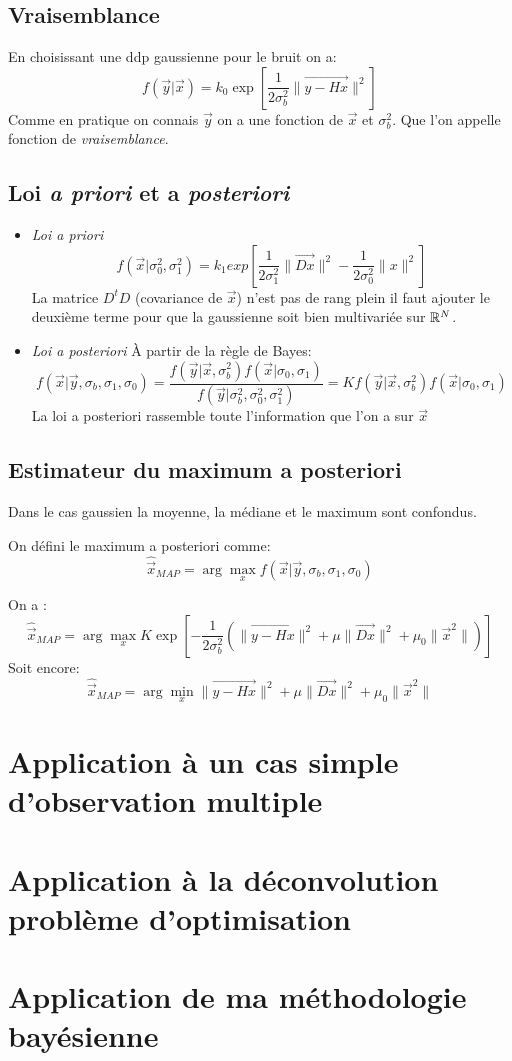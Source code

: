 \documentclass[main.tex]{subfiles}
\begin{document}
\subsection{Vraisemblance}
\begin{defin}
  En choisissant une ddp gaussienne pour le bruit on a:
  \[
    f(\vec{y}|\vec{x}) =k_0 \exp\left[ \frac{1}{2\sigma_b^2} \|\vec{y-Hx}\|^2\right]
  \]
  Comme en pratique on connais $\vec{y}$ on a une fonction de $\vec{x}$ et $\sigma_b^2$. Que l'on appelle fonction de \emph{vraisemblance}.
\end{defin}
\subsection{Loi \emph{a priori} et a \emph{posteriori}}

\begin{defin}
  \begin{itemize}
  \item \emph{Loi a priori}
  \[
    f(\vec{x}|\sigma_0^2,\sigma_1^2)= k_1 exp\left[\frac{1}{2\sigma_1^2} \|\vec{Dx}\|^2 - \frac{1}{2\sigma_0^2} \|x\|^2\right]
  \]
  La matrice $D^tD$ (covariance de $\vec{x}$) n'est pas de rang plein
  il  faut   ajouter le deuxième terme pour que la gaussienne soit
  bien multivariée sur $\mathbb{R}^N$.
\item \emph{Loi a posteriori}
  À partir de la règle de Bayes:
  \[
    f(\vec{x}|\vec{y},\sigma_b,\sigma_1,\sigma_0) = \frac{f(\vec{y}|\vec{x},\sigma_b^2)f(\vec{x}|\sigma_0,\sigma_1)}{f(\vec{y}|\sigma_b^2,\sigma_0^2,\sigma_1^2)}
    = K f(\vec{y}|\vec{x},\sigma_b^2)f(\vec{x}|\sigma_0,\sigma_1)
  \]
  La loi a posteriori rassemble toute l'information que l'on a  sur $\vec{x}$
\end{itemize}
\end{defin}
\subsection{Estimateur du maximum a posteriori}
Dans le cas gaussien la moyenne, la médiane et le maximum sont
confondus.
\begin{defin}
  On défini le maximum a posteriori comme:
  \[
    \hat{\vec{x}}_{MAP} =\arg\max_{x}f(\vec{x}|\vec{y},\sigma_b,\sigma_1,\sigma_0)
  \]
\end{defin}
\begin{prop}
  On a :
  \[
    \hat{\vec{x}}_{MAP} =\arg\max_{x}K\exp\left[-\frac{1}{2\sigma_b^2}(\|\vec{y-Hx}\|^2+\mu\|\vec{Dx}\|^2+\mu_0\|\vec{x}^2\|)\right]
  \]
  Soit encore:
  \[
  \hat{\vec{x}}_{MAP} =\arg\min_{x}\|\vec{y-Hx}\|^2+\mu\|\vec{Dx}\|^2+\mu_0\|\vec{x}^2\|
  \]
\end{prop}
\section{Application à un cas simple d'observation multiple}
\section{Application à la déconvolution problème d'optimisation}
\section{Application de ma méthodologie bayésienne}
\end{document}
